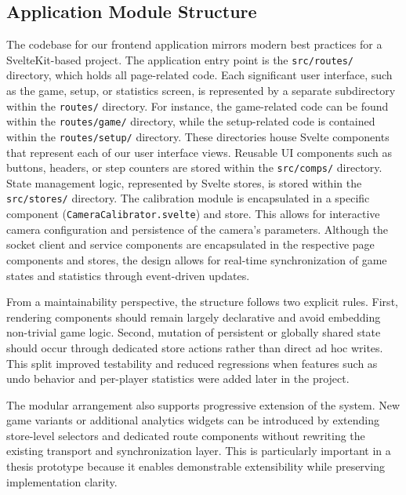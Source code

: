 \subsection{Application Module Structure}
The codebase for our frontend application mirrors modern best practices for a SvelteKit-based project. The application entry point is the \texttt{src/routes/} directory, which holds all page-related code. Each significant user interface, such as the game, setup, or statistics screen, is represented by a separate subdirectory within the \texttt{routes/} directory. For instance, the game-related code can be found within the \texttt{routes/game/} directory, while the setup-related code is contained within the \texttt{routes/setup/} directory. These directories house Svelte components that represent each of our user interface views. Reusable UI components such as buttons, headers, or step counters are stored within the \texttt{src/comps/} directory. State management logic, represented by Svelte stores, is stored within the \texttt{src/stores/} directory. The calibration module is encapsulated in a specific component (\texttt{CameraCalibrator.svelte}) and store. This allows for interactive camera configuration and persistence of the camera's parameters. Although the socket client and service components are encapsulated in the respective page components and stores, the design allows for real-time synchronization of game states and statistics through event-driven updates.

From a maintainability perspective, the structure follows two explicit rules. First, rendering components should remain largely declarative and avoid embedding non-trivial game logic. Second, mutation of persistent or globally shared state should occur through dedicated store actions rather than direct ad hoc writes. This split improved testability and reduced regressions when features such as undo behavior and per-player statistics were added later in the project.

The modular arrangement also supports progressive extension of the system. New game variants or additional analytics widgets can be introduced by extending store-level selectors and dedicated route components without rewriting the existing transport and synchronization layer. This is particularly important in a thesis prototype because it enables demonstrable extensibility while preserving implementation clarity.
 
